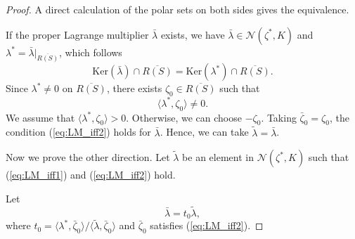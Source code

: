 \documentclass[leqno]{amsart}
\theoremstyle{definition}
\begin{document}
\begin{proof}
A direct calculation of the polar sets on both sides gives the equivalence.

If the proper Lagrange multiplier $\bar{\lambda}$ exists, we have $\bar{\lambda} \in \mathcal{N}(\zeta^*,K)$ and $\lambda^* = \bar{\lambda}|_{\overline{R(S)}}$, which follows 
$$ \mathrm{Ker}(\bar{\lambda})\cap \overline{R(S)} = \mathrm{Ker}(\lambda^*)\cap \overline{R(S)}.$$
Since $\lambda^*\neq 0$ on $\overline{R(S)}$, there exists $\zeta_0\in \overline{R(S)}$ such that
$$\langle \lambda^*, \zeta_0\rangle \neq 0.$$
We assume that
$\langle \lambda^*, \zeta_0\rangle > 0.$
Otherwise, we can choose $-\zeta_0$. Taking $\bar{\zeta}_0 = \zeta_0$, the condition (\ref{eq:LM_iff2}) holds for $\bar{\lambda}$. 
Hence, we can take $\tilde{\lambda} = \bar{\lambda}$. 

Now we prove the other direction. 
Let $\tilde{\lambda}$ be an element in $\mathcal{N}(\zeta^*,K)$ such that (\ref{eq:LM_iff1}) and (\ref{eq:LM_iff2}) hold. 

Let  
$$ \bar{\lambda} = t_0\tilde{\lambda},$$
where $t_0 = \langle \lambda^*, \bar{\zeta}_0\rangle/\langle \tilde{\lambda}, \bar{\zeta}_0\rangle$ and $\bar{\zeta}_0$ satisfies (\ref{eq:LM_iff2}). 


\end{proof}
\end{document}
